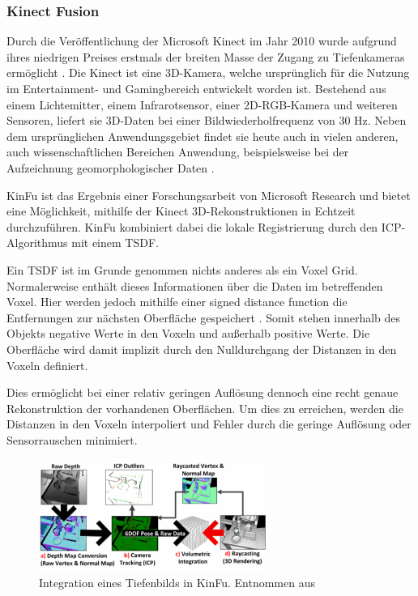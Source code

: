 \subsubsection{Kinect Fusion}
\label{subsubsec:kinfu}

Durch die Veröffentlichung der Microsoft Kinect im Jahr 2010 wurde aufgrund ihres niedrigen Preises erstmals der breiten Masse der Zugang zu Tiefenkameras ermöglicht \cite[1:55]{kinfuTalkYoutube}.
Die Kinect ist eine 3D-Kamera, welche ursprünglich für die Nutzung im Entertainment- und Gamingbereich entwickelt worden ist.
Bestehend aus einem Lichtemitter, einem Infrarotsensor, einer 2D-RGB-Kamera und weiteren Sensoren, liefert sie 3D-Daten bei einer Bildwiederholfrequenz von 30 Hz.
Neben dem ursprünglichen Anwendungsgebiet findet sie heute auch in vielen anderen, auch wissenschaftlichen Bereichen Anwendung, beispielsweise bei der Aufzeichnung geomorphologischer Daten \cite{mankoff2013kinect}.

\ac{KinFu} ist das Ergebnis einer Forschungsarbeit von Microsoft Research \cite{izadi2011kinectfusion, microsoftKinfuYoutube} und bietet eine Möglichkeit, mithilfe der Kinect 3D-Rekonstruktionen in Echtzeit durchzuführen.
\ac{KinFu} kombiniert dabei die lokale Registrierung durch den \ac{ICP}-Algorithmus mit einem \ac{TSDF}.

Ein \ac{TSDF} ist im Grunde genommen nichts anderes als ein Voxel Grid.
Normalerweise enthält dieses Informationen über die Daten im betreffenden Voxel.
Hier werden jedoch mithilfe einer signed distance function die Entfernungen zur nächsten Oberfläche gespeichert \cite{curless1996volumetric}.
Somit stehen innerhalb des Objekts negative Werte in den Voxeln und außerhalb positive Werte.
Die Oberfläche wird damit implizit durch den Nulldurchgang der Distanzen in den Voxeln definiert.

Dies ermöglicht bei einer relativ geringen Auflösung dennoch eine recht genaue Rekonstruktion der vorhandenen Oberflächen.
Um dies zu erreichen, werden die Distanzen in den Voxeln interpoliert und Fehler durch die geringe Auflösung oder Sensorrauschen minimiert.

\begin{figure}[ht]
	\centering
	\includegraphics[width=0.66\textwidth, frame]{images/kinfu-integration.png}
	\caption{Integration eines Tiefenbilds in \ac{KinFu}. Entnommen aus \cite{izadi2011kinectfusion}}
	\label{fig:kinfu-integration}
\end{figure}

